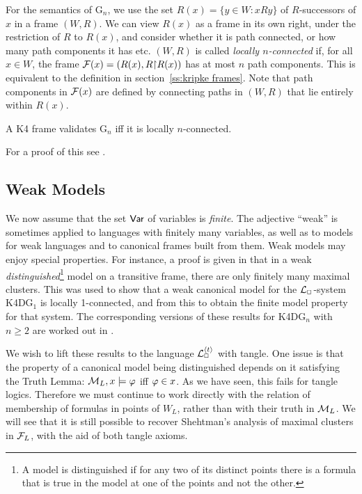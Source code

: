 For the semantics of G$_n$, we use the set $R(x)=\{y\in W:xRy\}$ of $R$-successors of $x$ in a frame $(W,R)$. We can view $R(x)$ as a frame in its own right, under the restriction of $R$ to $R(x)$, and consider whether it is path connected, or how many path components it has etc.  $(W,R)$ is called \emph{locally $n$-connected}  if, for all $x\in W$, the frame 
$\mathcal{F}(x)=(R(x),R{\restriction} R(x))$ has at most $n$ path components.
This is equivalent to the definition in section~\ref{ss:kripke frames}.
Note that path components in $\mathcal{F}(x)$ are defined by connecting paths in $(W,R)$ that lie entirely within $R(x)$. 

\begin{fact}\label{fact:Gn = loc nconn}
 A K4 frame validates G$_n$ iff it is locally $n$-connected. 
\end{fact}
For a proof of this see \cite[Theorem 3.7]{LucBry11}.





\subsection{Weak Models}\label{ss:weak models}

We now assume that the set $\mathsf{Var}$ of variables is \emph{finite}. The adjective ``weak'' is sometimes applied to languages with finitely many variables, as well as to models for weak languages and to canonical frames built from them. Weak models may enjoy special properties. For instance,  a proof is given in \cite[Lemma 8]{Sheh:d90} that in a weak
\emph{distinguished}\footnote{A model is distinguished if for any two of its distinct points there is a formula that is true
in the model at one of the points and not the other.} model on a transitive frame, there are only finitely many maximal clusters. 
This was used to show that a weak canonical model for the ${\cal L}_\Box$-system  K4DG$_1$ is locally 1-connected, and from this to obtain the finite model property for that system. The corresponding versions of these results for  K4DG$_n$ with $n\geq 2$ are worked out in \cite{LucBry11}.


We wish to lift these results to the language ${\cal L}_\Box^{\langle t\rangle}$ with tangle.  One issue is that the property of  a canonical model being distinguished depends on it satisfying the Truth Lemma: $\mathcal{M}_L,x\models\varphi$ iff $\varphi\in x$. As we have seen, this fails for tangle logics. Therefore we must continue to work directly with the relation of membership of formulas in points of $W_L$, rather than with their truth in $\mathcal{M}_L$. We will see that it is still possible to recover Shehtman's analysis of maximal clusters in $\mathcal{F}_L$, with the aid of both tangle axioms.

